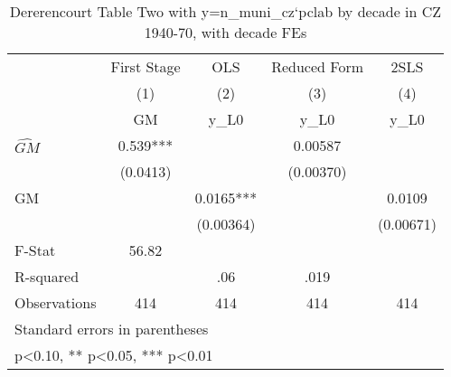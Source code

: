 \begin{table}[htbp]\centering
\def\sym#1{\ifmmode^{#1}\else\(^{#1}\)\fi}
\caption{Dererencourt Table Two with y=n\_muni\_cz`pclab by decade in CZ 1940-70, with decade FEs}
\begin{tabular}{l*{4}{c}}
\toprule
                    & First Stage   &         OLS   &Reduced Form   &        2SLS   \\
                    &\multicolumn{1}{c}{(1)}&\multicolumn{1}{c}{(2)}&\multicolumn{1}{c}{(3)}&\multicolumn{1}{c}{(4)}\\
                    &\multicolumn{1}{c}{GM}&\multicolumn{1}{c}{y\_L0}&\multicolumn{1}{c}{y\_L0}&\multicolumn{1}{c}{y\_L0}\\
\midrule
$\hat{GM}$          &       0.539***&               &     0.00587   &               \\
                    &    (0.0413)   &               &   (0.00370)   &               \\
\addlinespace
GM                  &               &      0.0165***&               &      0.0109   \\
                    &               &   (0.00364)   &               &   (0.00671)   \\
\midrule
F-Stat              &       56.82   &               &               &               \\
R-squared           &               &         .06   &        .019   &               \\
Observations        &         414   &         414   &         414   &         414   \\
\bottomrule
\multicolumn{5}{l}{\footnotesize Standard errors in parentheses}\\
\multicolumn{5}{l}{\footnotesize * p<0.10, ** p<0.05, *** p<0.01}\\
\end{tabular}
\end{table}
